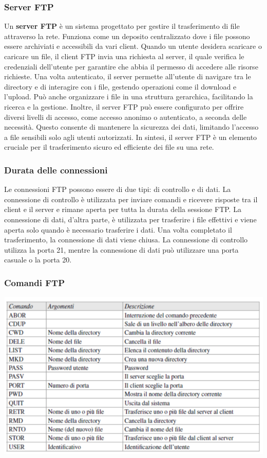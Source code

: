\documentclass[12pt]{report}
\begin{document}
	\subsubsection{Server FTP}
	Un \textbf{server FTP} è un sistema progettato per gestire il trasferimento di file attraverso la rete. Funziona come un deposito centralizzato dove i file possono essere archiviati e accessibili da vari client. Quando un utente desidera scaricare o caricare un file, il client FTP invia una richiesta al server, il quale verifica le credenziali dell'utente per garantire che abbia il permesso di accedere alle risorse richieste. Una volta autenticato, il server permette all'utente di navigare tra le directory e di interagire con i file, gestendo operazioni come il download e l'upload. Può anche organizzare i file in una struttura gerarchica, facilitando la ricerca e la gestione. Inoltre, il server FTP può essere configurato per offrire diversi livelli di accesso, come accesso anonimo o autenticato, a seconda delle necessità. Questo consente di mantenere la sicurezza dei dati, limitando l'accesso a file sensibili solo agli utenti autorizzati. In sintesi, il server FTP è un elemento cruciale per il trasferimento sicuro ed efficiente dei file su una rete.

	\subsubsection{Durata delle connessioni}
	Le connessioni FTP possono essere di due tipi: di controllo e di dati. La connessione di controllo è utilizzata per inviare comandi e ricevere risposte tra il client e il server e rimane aperta per tutta la durata della sessione FTP. La connessione di dati, d'altra parte, è utilizzata per trasferire i file effettivi e viene aperta solo quando è necessario trasferire i dati. Una volta completato il trasferimento, la connessione di dati viene chiusa. La connessione di controllo utilizza la porta 21, mentre la connessione di dati può utilizzare una porta casuale o la porta 20.

	\subsubsection{Comandi FTP}
	\begin{center}
		\includegraphics[scale=0.6]{assets/ftp-cmd.png}
	\end{center}
\end{document}
